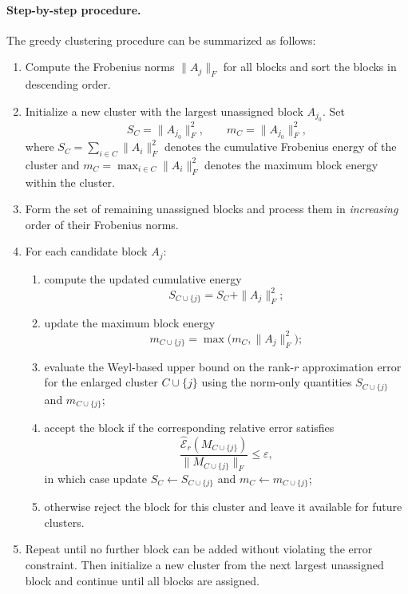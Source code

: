 \documentclass[10pt]{article} %
\begin{document}
\paragraph{Step-by-step procedure.}
The greedy clustering procedure can be summarized as follows:
\begin{enumerate}
  \item Compute the Frobenius norms $\|A_j\|_F$ for all blocks and sort the
  blocks in descending order.

  \item Initialize a new cluster with the largest unassigned block $A_{j_0}$.
  Set
  \[
    S_C = \|A_{j_0}\|_F^2, \qquad
    m_C = \|A_{j_0}\|_F^2,
  \]
  where $S_C = \sum_{i\in C}\|A_i\|_F^2$ denotes the cumulative Frobenius
  energy of the cluster and $m_C = \max_{i\in C}\|A_i\|_F^2$ denotes the
  maximum block energy within the cluster.

  \item Form the set of remaining unassigned blocks and process them in
  \emph{increasing} order of their Frobenius norms.

  \item For each candidate block $A_j$:
  \begin{enumerate}
    \item compute the updated cumulative energy
    \[
      S_{C\cup\{j\}} = S_C + \|A_j\|_F^2;
    \]

    \item update the maximum block energy
    \[
      m_{C\cup\{j\}} = \max\bigl(m_C, \|A_j\|_F^2\bigr);
    \]

    \item evaluate the Weyl-based upper bound on the rank-$r$ approximation
    error for the enlarged cluster $C\cup\{j\}$ using the norm-only
    quantities $S_{C\cup\{j\}}$ and $m_{C\cup\{j\}}$;

    \item accept the block if the corresponding relative error satisfies
    \[
      \frac{\widehat{\mathcal{E}}_r(M_{C\cup\{j\}})}
           {\|M_{C\cup\{j\}}\|_F}
      \le \varepsilon,
    \]
    in which case update $S_C \leftarrow S_{C\cup\{j\}}$ and
    $m_C \leftarrow m_{C\cup\{j\}}$;

    \item otherwise reject the block for this cluster and leave it available
    for future clusters.
  \end{enumerate}

  \item Repeat until no further block can be added without violating the
  error constraint. Then initialize a new cluster from the next largest
  unassigned block and continue until all blocks are assigned.
\end{enumerate}
\end{document}
